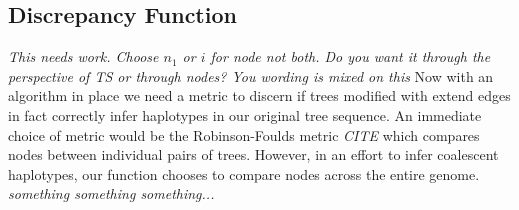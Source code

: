 \documentclass[10pt,twoside,lineno]{gsajnl}
\newcommand{\T}{\mathbb{T}}
\newcommand{\tn}{\textnormal}
\newcommand{\comment}[1]{{\color{violet} \it #1}}
\begin{document}
%	
%
%
%
%
%



\subsection{Discrepancy Function}

\par \comment{This needs work. Choose $n_1$ or $i$ for node not both. Do you want it through the perspective of TS or through nodes? You wording is mixed on this}
 Now with an algorithm in place
 we need a metric to discern
 if trees modified with extend edges
 in fact correctly infer haplotypes in our original tree sequence.
 An immediate choice of metric would be the Robinson-Foulds metric \comment{CITE} which compares nodes between individual pairs of trees.
 However, in an effort to infer coalescent haplotypes, our function chooses to compare nodes
 across the entire genome. 
 \comment{something something something...}
 
\end{document}
